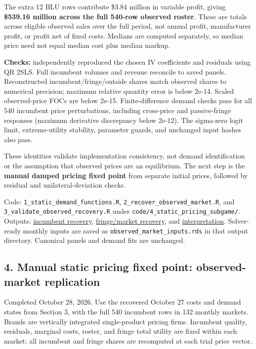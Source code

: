 \documentclass[10pt,]{article}
\begin{document}
The extra 12 BLU rows contribute \$3.84 million in variable profit,
giving \textbf{\$539.16 million across the full 540-row observed
roster}. These are totals across eligible observed sales over the full
period, not annual profit, manufacturer profit, or profit net of fixed
costs. Medians are computed separately, so median price need not equal
median cost plus median markup.

\textbf{Checks:} independently reproduced the chosen IV coefficients and
residuals using QR 2SLS. Full incumbent volumes and revenue reconcile to
saved panels. Reconstructed incumbent/fringe/outside shares match
observed shares to numerical precision; maximum relative quantity error
is below 2e-14. Scaled observed-price FOCs are below 2e-15.
Finite-difference demand checks pass for all 540 incumbent price
perturbations, including cross-price and passive-fringe responses
(maximum derivative discrepancy below 2e-12). The sigma-zero logit
limit, extreme-utility stability, parameter guards, and unchanged input
hashes also pass.

These identities validate implementation consistency, not demand
identification or the assumption that observed prices are an
equilibrium. The next step is the \textbf{manual damped pricing fixed
point} from separate initial prices, followed by residual and
unilateral-deviation checks.

Code: \texttt{1\_static\_demand\_functions.R},
\texttt{2\_recover\_observed\_market.R}, and
\texttt{3\_validate\_observed\_recovery.R} under
\texttt{code/4\_static\_pricing\_subgame/}. Outputs:
\href{../../output/static_pricing_subgame/observed_recovery_2026-10-27/incumbent_recovery.csv}{incumbent
recovery},
\href{../../output/static_pricing_subgame/observed_recovery_2026-10-27/fringe_market_recovery.csv}{fringe/market
recovery}, and
\href{../../output/static_pricing_subgame/observed_recovery_2026-10-27/interpretation.txt}{interpretation}.
Solver-ready monthly inputs are saved as
\texttt{observed\_market\_inputs.rds} in that output directory.
Canonical panels and demand fits are unchanged.

\subsection{4. Manual static pricing fixed point: observed-market
replication}\label{manual-static-pricing-fixed-point-observed-market-replication}

Completed October 28, 2026. Use the recovered October 27 costs and
demand states from Section 3, with the full 540 incumbent rows in 132
monthly markets. Brands are vertically integrated single-product pricing
firms. Incumbent quality, residuals, marginal costs, roster, and fringe
total utility are fixed within each market; all incumbent and fringe
shares are recomputed at each trial price vector.
\end{document}
